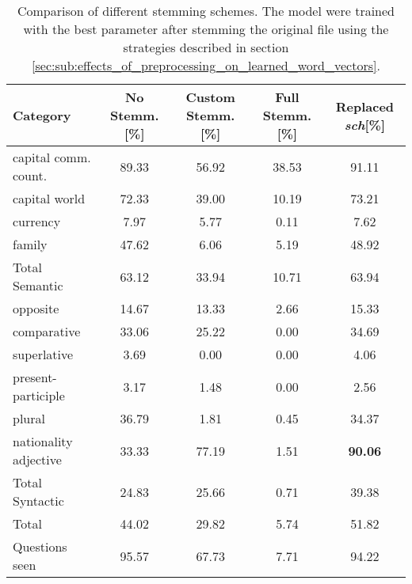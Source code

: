 \begin{table}[h]
\centering
\small
\caption{Comparison of different stemming schemes. The model were trained
  with the best parameter after stemming the original file using the
  strategies described in section \ref{sec:sub:effects_of_preprocessing_on_learned_word_vectors}. } 
\label{tab:stemming_comparisson}
\small
\begin{tabular}{|l|c|c|c|c|}
\hline
 Category                  & No Stemm.[\%]         & Custom Stemm.[\%]  &  Full Stemm.[\%]  &  Replaced \emph{sch}[\%]    \\
\hline
capital comm. count.  &         89.33   &     56.92  &               38.53  &                     91.11  \\
capital world             &       72.33      &     39.00  &               10.19  &                     73.21  \\
currency                  &        7.97    &      5.77  &                0.11  &                      7.62  \\
family                    &         47.62     &      6.06  &                5.19  &                     48.92  \\
\hline
 Total Semantic            &      63.12     &      33.94  &               10.71  &                     63.94  \\
\hline
 opposite                  &      14.67      &     13.33  &                2.66  &                     15.33  \\
 comparative               &       33.06       &     25.22  &                0.00  &                     34.69  \\
 superlative               &      3.69      &      0.00  &                0.00  &                      4.06  \\
 present-participle        &        3.17     &      1.48  &                0.00  &                      2.56  \\
 plural                    &        36.79    &      1.81  &                0.45  &                     34.37  \\
 nationality adjective     &        33.33    &     77.19  &                1.51  &            \textbf{90.06}  \\
\hline
 Total Syntactic            &        24.83    &     25.66  &                0.71  &                     39.38  \\
\hline
 Total                     &         44.02    &    29.82  &                5.74  &                     51.82  \\
\hline
 Questions seen            &       95.57      &    67.73  &                7.71  &                     94.22  \\
\hline
\end{tabular}
\end{table}


